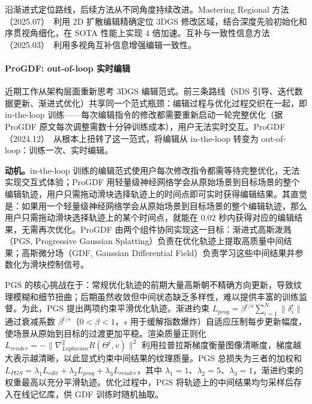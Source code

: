 沿渐进式定位路线，后续方法从不同角度持续改进。Mastering Regional 方法（2025.07）~\cite{2507_05426}利用 2D 扩散编辑精确定位 3DGS 修改区域，结合深度先验初始化和序贯视角细化，在 SOTA 性能上实现 4 倍加速。互补与一致性信息方法（2025.03）~\cite{2503_11601}利用多视角互补信息增强编辑一致性。

\paragraph{ProGDF: out-of-loop 实时编辑}

近期工作从架构层面重新思考 3DGS 编辑范式。前三条路线（SDS 引导、迭代数据更新、渐进式优化）共享同一个范式瓶颈：编辑过程与优化过程交织在一起，即 in-the-loop 训练——每次编辑指令的修改都需要重新启动一轮完整优化（据 ProGDF 原文每次调整需数十分钟训练成本），用户无法实时交互。ProGDF（2024.12）~\cite{2412_08152}从根本上扭转了这一范式，将编辑从 in-the-loop 转变为 out-of-loop：训练一次、实时编辑。

\textbf{动机。}in-the-loop 训练的编辑范式使用户每次修改指令都需等待完整优化，无法实现交互式体验；ProGDF 用轻量级神经网络学会从原始场景到目标场景的整个编辑轨迹，用户只需拖动滑块选择轨迹上的时间点即可实时获得编辑结果。其直觉是：如果用一个轻量级神经网络学会从原始场景到目标场景的整个编辑轨迹，那么用户只需拖动滑块选择轨迹上的某个时间点，就能在 $0.02$ 秒内获得对应的编辑结果，无需再次优化。ProGDF 由两个组件协同实现这一目标：渐进式高斯泼溅（PGS, Progressive Gaussian Splatting）负责在优化轨迹上提取高质量中间结果；高斯微分场（GDF, Gaussian Differential Field）负责学习这些中间结果并参数化为滑块控制信号。

PGS 的核心挑战在于：常规优化轨迹的前期大量高斯朝不精确方向更新，导致纹理模糊和细节扭曲；后期虽然收敛但中间状态缺乏多样性，难以提供丰富的训练监督。为此，PGS 提出两项约束平滑优化轨迹。渐进约束 $L_{prog} = \beta^{t/s}\sum_{i=1}^{N}\|\delta_i^t\|$ 通过衰减系数 $\beta^{t/s}$（$0<\beta<1$，$s$ 用于缓解指数爆炸）自适应压制每步更新幅度，使场景从原始到目标的过渡更加平稳。渲染质量正则化 $L_{render} = -\|\nabla_{Laplacian}^2 R(\Theta^t,v)\|^2$ 利用拉普拉斯梯度衡量图像清晰度，梯度越大表示越清晰，以此显式约束中间结果的纹理质量。PGS 总损失为三者的加权和 $L_{PGS} = \lambda_1 L_{edit} + \lambda_2 L_{prog} + \lambda_3 L_{render}$，其中 $\lambda_1=1$、$\lambda_2=5$、$\lambda_3=1$，渐进约束的权重最高以充分平滑轨迹。优化过程中，PGS 将轨迹上的中间结果均匀采样后存入在线记忆库，供 GDF 训练时随机抽取。

